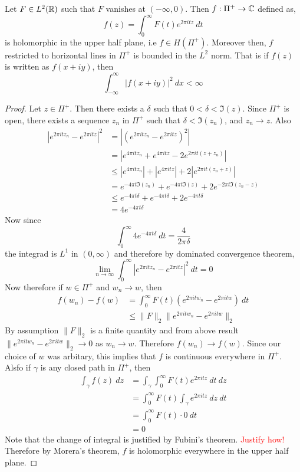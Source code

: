 \begin{proposition}
  Let $F\in L^2(\mathbb R)$ such that $F$ vanishes at $(-\infty , 0)$. Then $f : \Pi^+ \to \mathbb C$ defined as, $$f(z) = \int_0^\infty F(t) e^{2\pi itz} \ dt$$
  is holomorphic in the upper half plane, i.e $f \in H(\Pi^+)$. Moreover then, $f$ restricted to horizontal lines in $\Pi^+$ is bounded in the  $L^2$ norm. That is if $f(z)$ is written as $f(x+iy)$, then $$\int_{-\infty}^\infty \left|f(x + iy)\right|^2 \ dx < \infty$$
\end{proposition}
\begin{proof}
  Let $z \in \Pi^+$. Then there exists a $\delta$ such that $0< \delta < \Im(z)$. Since $\Pi^+$ is open, there exists a sequence $z_n$ in $\Pi^+$ such that $\delta < \Im(z_n)$, and  $z_n \to z$. Also 
  \begin{align*}
    \left|e^{2 \pi itz_n} - e^{2\pi itz}\right|^2 &= \left|\left(e^{2\pi it z_n} - e^{2\pi itz}\right)^2\right| \\ 
    &= \left| e^{4\pi itz_n} + e^{4\pi itz} - 2e^{2\pi it(z+z_n)} \right| \\
    &\le \left|e^{4\pi itz_n}\right| + \left|e^{4\pi itz}\right| + 2\left|e^{2\pi it(z_n + z)}\right| \\
    &= e^{-4\pi t \Im(z_n)} + e^{-4 \pi t \Im(z)} + 2e^{-2\pi t \Im(z_n - z)} \\
    &\le e^{-4\pi t \delta} + e^{-4\pi t \delta} + 2e^{-4 \pi t\delta} \\
    &=4e^{-4\pi t \delta}
  \end{align*}
  Now since $$\int_0^\infty 4e^{-4\pi t\delta} \ dt = \frac{4}{2\pi \delta}$$
  the integrad is $L^1$ in $(0, \infty)$ and therefore by dominated convergence theorem, $$\lim_{n \to \infty} \int_0^\infty \left|e^{2\pi itz_n} - e^{2\pi itz}\right|^2 \ dt = 0$$
  Now therefore if $w \in \Pi^+$ and $w_n \to w$, then 
  \begin{align*}
    f(w_n) - f(w) &= \int_0^\infty F(t)(e^{2\pi it w_n} - e^{2\pi i tw}) \ dt \\
    & \le \|F\|_2 \|e^{2\pi itw_n} - e^{2\pi itw}\|_2
  \end{align*}
  By assumption $\|F\|_2$ is a finite quantity and from above result $\|e^{2\pi itw_n} - e^{2\pi itw}\|_2 \to 0$ as $w_n \to w$. Therefore $f(w_n) \to f(w)$. Since our choice of $w$ was arbitary, this implies that $f$ is continuous everywhere in $\Pi^+$. Alsfo if $\gamma$ is any closed path in $\Pi^+$, then 
  \begin{align*}
    \int_\gamma f(z)\ dz &= \int_\gamma \int_0^\infty F(t) e^{2\pi i t z} \ dt \ dz \\
    & = \int_0^\infty F(t) \int_\gamma e^{2\pi itz} \ dz \ dt \\
    & = \int_0^\infty F(t) \cdot 0 \ dt \\
    & = 0
  \end{align*}
  Note that the change of integral is justified by Fubini's theorem. \textcolor{red}{Justify how!} Therefore by Morera's theorem, $f$ is holomorphic everywhere in the upper half plane.  


\end{proof}
